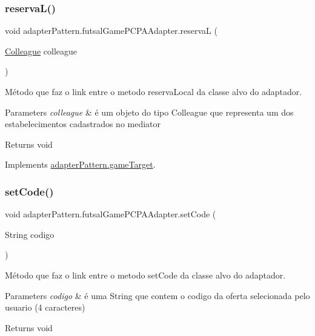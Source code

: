 \subsubsection{\texorpdfstring{reservaL()}{reservaL()}}
{\footnotesize\ttfamily void adapter\+Pattern.\+futsal\+Game\+P\+C\+P\+A\+Adapter.\+reservaL (\begin{DoxyParamCaption}\item[{\mbox{\hyperlink{classmediator_pattern_1_1_colleague}{Colleague}}}]{colleague }\end{DoxyParamCaption})}



Método que faz o link entre o metodo reserva\+Local da classe alvo do adaptador. 


\begin{DoxyParams}{Parameters}
{\em colleague} & é um objeto do tipo Colleague que representa um dos estabelecimentos cadastrados no mediator \\
\hline
\end{DoxyParams}
\begin{DoxyReturn}{Returns}
void 
\end{DoxyReturn}


Implements \mbox{\hyperlink{interfaceadapter_pattern_1_1game_target_a663405a3d10988de25c6ea3ef63c68eb}{adapter\+Pattern.\+game\+Target}}.

\mbox{\label{classadapter_pattern_1_1futsal_game_p_c_p_a_adapter_adbc71805ef1fab79c986d37ec9195a5b}} 
\subsubsection{\texorpdfstring{setCode()}{setCode()}}
{\footnotesize\ttfamily void adapter\+Pattern.\+futsal\+Game\+P\+C\+P\+A\+Adapter.\+set\+Code (\begin{DoxyParamCaption}\item[{String}]{codigo }\end{DoxyParamCaption})}



Método que faz o link entre o metodo set\+Code da classe alvo do adaptador. 


\begin{DoxyParams}{Parameters}
{\em codigo} & é uma String que contem o codigo da oferta selecionada pelo usuario (4 caracteres) \\
\hline
\end{DoxyParams}
\begin{DoxyReturn}{Returns}
void 
\end{DoxyReturn}


